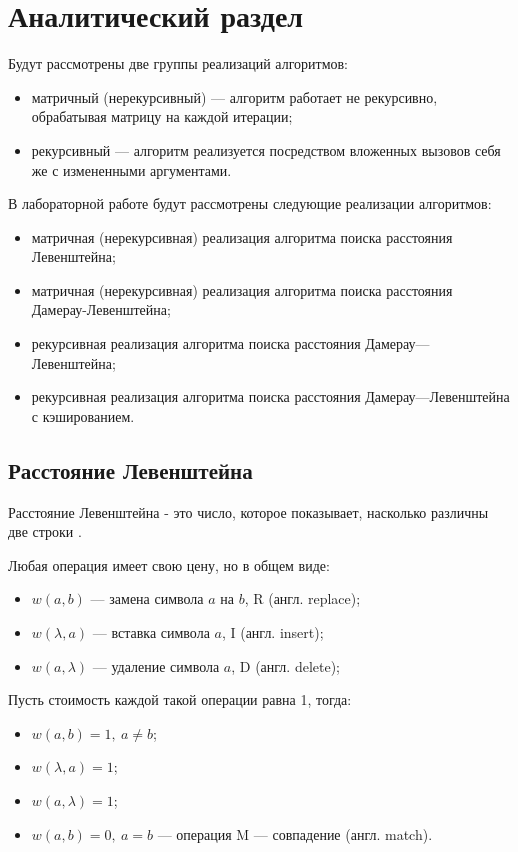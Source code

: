 \chapter{Аналитический раздел}

Будут рассмотрены две группы реализаций алгоритмов:
\begin{itemize}
	\item матричный (нерекурсивный) --- алгоритм работает не рекурсивно, обрабатывая матрицу на каждой итерации;
	\item рекурсивный --- алгоритм реализуется посредством вложенных вызовов себя же с измененными аргументами.
\end{itemize}

В лабораторной работе будут рассмотрены следующие реализации алгоритмов:
\begin{itemize}
	\item матричная (нерекурсивная) реализация алгоритма поиска расстояния Левенштейна;
	\item матричная (нерекурсивная) реализация алгоритма поиска расстояния Дамерау-Левенштейна;
	\item рекурсивная реализация алгоритма поиска расстояния Дамерау---Левенштейна;
	\item рекурсивная реализация алгоритма поиска расстояния Дамерау---Левенштейна с кэшированием.
\end{itemize}

\section{Расстояние Левенштейна}
Расстояние Левенштейна - это число, которое показывает, насколько различны две строки \cite{definition-lev}.

Любая операция имеет свою цену, но в общем виде:
\begin{itemize}
	\item $w(a, b)$ --- замена символа $a$ на $b$, R (англ. replace);
	\item $w(\lambda, a)$ --- вставка символа $a$, I (англ. insert);
	\item $w(a, \lambda)$ --- удаление символа $a$, D (англ. delete);
\end{itemize}

Пусть стоимость каждой такой операции равна 1, тогда:
\begin{itemize}
	\item $w(a, b) = 1, \medspace a \neq b$;
	\item $w(\lambda, a) = 1$;
	\item $w(a, \lambda) = 1$;
	\item $w(a, b) = 0, \medspace a = b$ --- операция M --- совпадение (англ. match).
\end{itemize}

